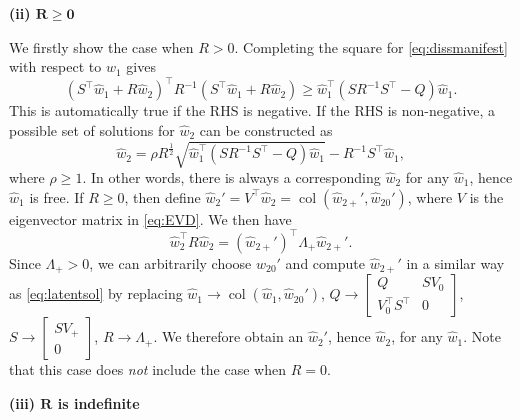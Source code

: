 \documentclass[11pt,print,draftcls,onecolumn,romanappendices]{ieeecolor}
\DeclareMathOperator{\col}{col}
\begin{document}
\noindent \textbf{(ii) $\boldsymbol{R\geq0}$}

\noindent We firstly show the case when $R>0$. Completing the square for \eqref{eq:dissmanifest} with respect to $w_1$ gives
\begin{equation*}
	(S^\top \hat{w}_1+R\hat{w}_2)^\top R^{-1}(S^\top \hat{w}_1+R\hat{w}_2)\geq \hat{w}_1^\top (SR^{-1}S^\top -Q)\hat{w}_1.
\end{equation*}
This is automatically true if the RHS is negative. If the RHS is non-negative, a possible set of solutions for $\hat{w}_2$ can be constructed as
\begin{equation}\label{eq:latentsol}
	\hat{w}_2=\rho R^{\frac{1}{2}}\sqrt{\hat{w}_1^\top (SR^{-1}S^\top -Q)\hat{w}_1}-R^{-1}S^\top \hat{w}_1,
\end{equation}
where $\rho\geq1$. In other words, there is always a corresponding $\hat{w}_2$ for any $\hat{w}_1$, hence $\hat{w}_1$ is free. If $R\geq0$, then define $\hat{w}_2'=V^\top\hat{w}_2=\col(\hat{w}_{2+}',\hat{w}_{20}')$, where $V$ is the eigenvector matrix in \eqref{eq:EVD}. We then have 
\begin{equation*}
	\hat{w}_2^\top R\hat{w}_2=(\hat{w}_{2+}')^\top \Lambda_+\hat{w}_{2+}'.
\end{equation*}
Since $\Lambda_+>0$, we can arbitrarily choose $\hat{w}_{20}'$ and compute $\hat{w}_{2+}'$ in a similar way as \eqref{eq:latentsol} by replacing $\hat{w}_1\rightarrow\col(\hat{w}_1,\hat{w}_{20}')$, $Q\rightarrow \begin{bmatrix}
	Q & SV_0\\ V_0^\top S^\top & 0
\end{bmatrix}$, $S\rightarrow\begin{bmatrix}
SV_+ \\ 0
\end{bmatrix}$, $R\rightarrow\Lambda_+$. We therefore obtain an $\hat{w}_2'$, hence $\hat{w}_2$, for any $\hat{w}_1$. Note that this case does \emph{not} include the case when $R=0$.

\noindent \textbf{(iii) $\boldsymbol{R}$ is indefinite}
\end{document}
